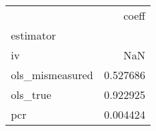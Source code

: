 \begin{tabular}{lr}
\toprule
{} &     coeff \\
estimator       &           \\
\midrule
iv              &       NaN \\
ols\_mismeasured &  0.527686 \\
ols\_true        &  0.922925 \\
pcr             &  0.004424 \\
\bottomrule
\end{tabular}
